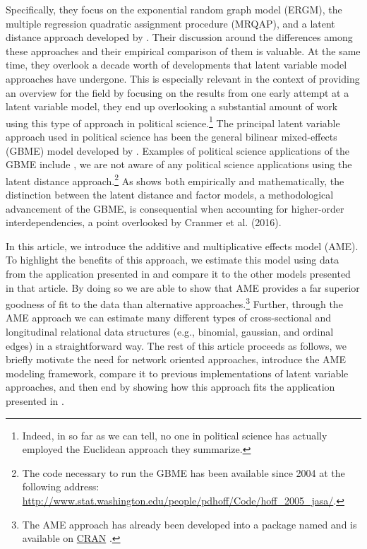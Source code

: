 Specifically, they focus on the exponential random graph model (ERGM), the multiple regression quadratic assignment procedure (MRQAP), and a latent distance approach developed by \citet{hoff:etal:2002}. Their discussion around the differences among these approaches and their empirical comparison of them is  valuable. At the same time, they overlook a decade worth of developments that latent variable model approaches have undergone. This is especially relevant in the context of providing an overview for the field by focusing on the results from one early attempt at a latent variable model, they end up overlooking a substantial amount of work using this type of approach in political science.\footnote{Indeed, in so far as we can tell, no one in political science has actually employed the Euclidean approach they summarize.} The principal latent variable approach used in political science has been the general bilinear mixed-effects (GBME) model developed by \citet{hoff:2005}. Examples of political science applications of the GBME include \citet{hoff:ward:2004,ward:etal:2007,cao:2009,cao:2010, cao:2012,breunig:etal:2012,ward:etal:2012,cao:ward:2014,metternich:etal:2015,greenhill:2015}, we are not aware of any political science applications using the latent distance approach.\footnote{The code necessary to run the GBME has been available since 2004 at the following address: \url{http://www.stat.washington.edu/people/pdhoff/Code/hoff_2005_jasa/}.} As \citet{hoff:2008} shows both empirically and mathematically, the distinction between the latent distance and factor models, a methodological advancement of the GBME, is consequential when accounting for higher-order interdependencies, a point overlooked by Cranmer et al. (2016).

In this article, we introduce the additive and multiplicative effects model (AME). To highlight the benefits of this approach, we estimate this model using data from  the application presented in \citet{cranmer:etal:2016} and compare it to the other models presented in that article. By doing so we are able to show that AME provides a far superior goodness of fit to the data than alternative approaches.\footnote{The AME approach has already been developed into a package named  and is available on \href{https://cran.r-project.org/web/packages/amen/index.html}{CRAN} \citep{hoff:etal:2015}.} Further, through the AME approach we can estimate many different types of cross-sectional and longitudinal relational data structures (e.g., binomial, gaussian, and ordinal edges) in a straightforward way. The rest of this article proceeds as follows, we briefly motivate the need for network oriented approaches, introduce the AME modeling framework, compare it to previous implementations of latent variable approaches, and then end by showing how this approach fits the application presented in \citet{cranmer:etal:2016}. 

